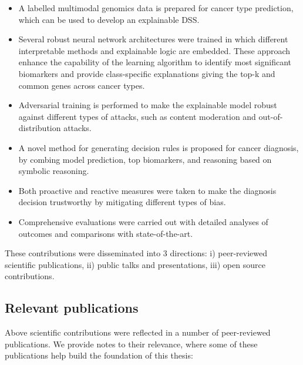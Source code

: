 \begin{itemize}[noitemsep]
    \item A labelled multimodal genomics data is prepared for cancer type prediction, which can be used to develop an explainable DSS.  
    \item Several robust neural network architectures were trained in which different interpretable methods and explainable logic are embedded. These approach enhance the capability of the learning algorithm to identify most significant biomarkers and provide class-specific explanations giving the top-k and common genes across cancer types. 
    \item Adversarial training is performed to make the explainable model robust against different types of attacks, such as content moderation and out-of-distribution attacks. 
    \item A novel method for generating decision rules is proposed for cancer diagnosis, by combing model prediction, top biomarkers, and reasoning based on symbolic reasoning. 
    \item Both proactive and reactive measures were taken to make the diagnosis decision trustworthy by mitigating different types of bias. 
    \item Comprehensive evaluations were carried out with detailed analyses of outcomes and comparisons with state-of-the-art. 
\end{itemize}

\hspace*{3.5mm} These contributions were disseminated into 3 directions: i) peer-reviewed scientific publications, ii) public talks and presentations, iii) open source contributions. %

\subsection{Relevant publications}
Above scientific contributions were reflected in a number of peer-reviewed publications. We provide notes to their relevance, where some of these publications help build the foundation of this thesis: 

